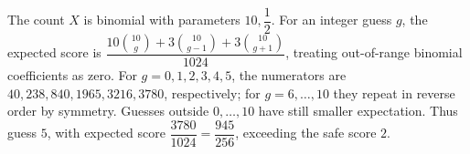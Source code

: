 The count $X$ is binomial with parameters $10,\dfrac{1}{2}$. For an integer guess $g$, the expected score is $\dfrac{10\binom{10}{g}+3\binom{10}{g-1}+3\binom{10}{g+1}}{1024}$, treating out-of-range binomial coefficients as zero. For $g=0,1,2,3,4,5$, the numerators are $40,238,840,1965,3216,3780$, respectively; for $g=6,\ldots,10$ they repeat in reverse order by symmetry. Guesses outside $0,\ldots,10$ have still smaller expectation. Thus guess $\boxed5$, with expected score $\dfrac{3780}{1024}=\boxed{\dfrac{945}{256}}$, exceeding the safe score $2$.

